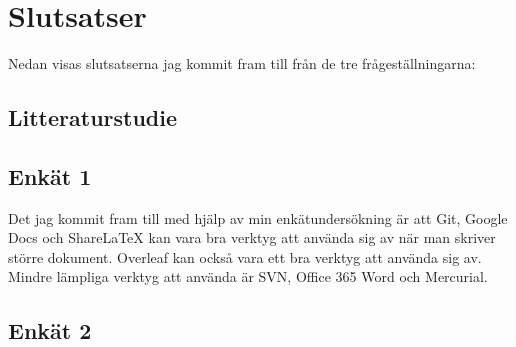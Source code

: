 \section{Slutsatser}
\label{sec:conclusions-tuhkala}
Nedan visas slutsatserna jag kommit fram till från de tre frågeställningarna:

\subsection{Litteraturstudie}


\subsection{Enkät 1}
Det jag kommit fram till med hjälp av min enkätundersökning är att Git, Google Docs och ShareLaTeX kan vara bra verktyg att använda sig av när man skriver större dokument. Overleaf kan också vara ett bra verktyg att använda sig av. Mindre lämpliga verktyg att använda är SVN, Office 365 Word och Mercurial.

\subsection{Enkät 2}


